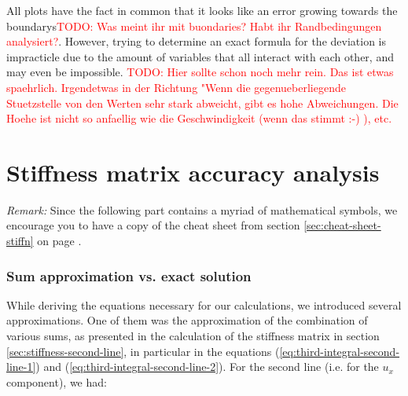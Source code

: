 \documentclass{article}
\newcommand{\todo}[2][]{\textcolor{red}{TODO\ifthenelse{\equal{#1}{}}{}{[#1]}: #2}}
\begin{document}
All plots have the fact in common that it looks like an error growing towards the boundarys\todo{Was meint ihr mit buondaries? Habt ihr Randbedingungen analysiert?}.
However, trying to determine an exact formula for the deviation is impracticle due to the amount of variables that all interact with each other, and may even be impossible.
\todo{Hier sollte schon noch mehr rein. Das ist etwas spaehrlich. Irgendetwas in der Richtung "Wenn die gegenueberliegende Stuetzstelle von den Werten sehr stark abweicht, gibt es hohe Abweichungen. Die Hoehe ist nicht so anfaellig wie die Geschwindigkeit (wenn das stimmt :-) ), etc.}

\clearpage{}


\newpage
\part{Stiffness matrix accuracy analysis}
\label{part:stiffness-matrix}

\emph{Remark:} Since the following part contains a myriad of mathematical symbols, we encourage you to have a copy of the cheat sheet from section \ref{sec:cheat-sheet-stiffn} on page \pageref{sec:cheat-sheet-stiffn}.

\section{Sum approximation vs. exact solution}
\label{sec:point-wise-appr-vs-exact-solution-intro}

While deriving the equations necessary for our calculations, we introduced several approximations. One of them was the approximation of the combination of various sums, as presented in the calculation of the stiffness matrix in section \ref{sec:stiffness-second-line}, in particular in the equations (\ref{eq:third-integral-second-line-1}) and (\ref{eq:third-integral-second-line-2}). For the second line (i.e. for the $u_x$ component), we had:
\end{document}
